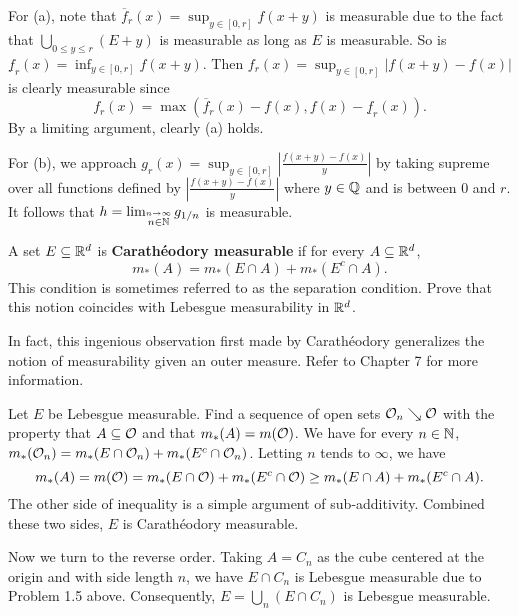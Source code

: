 \begin{Solution}
  For (a), note that $\overline{f}_r(x)=\sup_{y\in[0,r]}f(x+y)$ is measurable due to the fact that $\bigcup_{0\leq y\leq r}(E+y)$ is measurable as long as $E$ is measurable. So is $\underline{f}_r(x)=\inf_{y\in[0,r]}f(x+y)$. Then \mbox{$f_r(x)=\sup_{y\in[0,r]}|f(x+y)-f(x)|$} is clearly measurable since
  $$
  f_r(x)=\max(\overline{f}_r(x)-f(x),f(x)-\underline{f}_r(x)).
  $$
  By a limiting argument, clearly (a) holds.

  For (b), we approach $g_r(x)=\sup_{y\in[0,r]}\left|\frac{f(x+y)-f(x)}y\right|$ by taking supreme over all functions defined by $\left|\frac{f(x+y)-f(x)}{y}\right|$ where $y\in\mathbb{Q}$ and is between $0$ and $r$. It follows that $h=\lim_{\stackrel{n\to\infty}{n\in\mathbb{N}}}g_{1/n}$ is measurable.
\end{Solution}

\begin{Exercise}
  A set $E\subseteq\mathbb{R}^d$ is \textbf{Carath\'eodory measurable} if for every $A\subseteq\mathbb{R}^d$,
  $$
  m_*(A)=m_*(E\cap A)+m_*(E^c\cap A).
  $$
  This condition is sometimes referred to as the separation condition. Prove that this notion coincides with Lebesgue measurability in $\mathbb{R}^d$.

  In fact, this ingenious observation first made by Carath\'eodory generalizes the notion of measurability given an outer measure. Refer to Chapter 7 for more information.
\end{Exercise}

\begin{Solution}
  Let $E$ be Lebesgue measurable. Find a sequence of open sets $\mathcal{O}_n\searrow \mathcal{O}$ with the property that $A\subseteq \mathcal{O}$ and that $m_*(A)=m(\mathcal{O})$. We have for every $n\in\mathbb{N}$, $m_*(\mathcal{O}_n)=m_*(E\cap\mathcal{O}_n)+m_*(E^c\cap\mathcal{O}_n)$. Letting $n$ tends to $\infty$, we have
  $$
  m_*(A)=m(\mathcal{O})=m_*(E\cap \mathcal{O})+m_*(E^c\cap \mathcal{O})\geq m_*(E\cap A)+m_*(E^c\cap A).
  $$
  The other side of inequality is a simple argument of sub-additivity. Combined these two sides, $E$ is Carath\'eodory measurable.

  Now we turn to the reverse order. Taking $A=C_n$ as the cube centered at the origin and with side length $n$, we have $E\cap C_n$ is Lebesgue measurable due to Problem 1.5 above. Consequently, $E=\bigcup_n(E\cap C_n)$ is Lebesgue measurable.
\end{Solution}